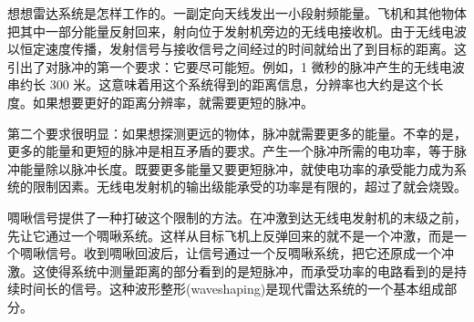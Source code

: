 想想雷达系统是怎样工作的。一副定向天线发出一小段射频能量。飞机和其他物体把其中一部分能量反射回来，射向位于发射机旁边的无线电接收机。由于无线电波以恒定速度传播，发射信号与接收信号之间经过的时间就给出了到目标的距离。这引出了对脉冲的第一个要求：它要尽可能短。例如，1
微秒的脉冲产生的无线电波串约长 300
米。这意味着用这个系统得到的距离信息，分辨率也大约是这个长度。如果想要更好的距离分辨率，就需要更短的脉冲。

第二个要求很明显：如果想探测更远的物体，脉冲就需要更多的能量。不幸的是，更多的能量和更短的脉冲是相互矛盾的要求。产生一个脉冲所需的电功率，等于脉冲能量除以脉冲长度。既要更多能量又要更短脉冲，就使电功率的承受能力成为系统的限制因素。无线电发射机的输出级能承受的功率是有限的，超过了就会烧毁。

啁啾信号提供了一种打破这个限制的方法。在冲激到达无线电发射机的末级之前，先让它通过一个啁啾系统。这样从目标飞机上反弹回来的就不是一个冲激，而是一个啁啾信号。收到啁啾回波后，让信号通过一个反啁啾系统，把它还原成一个冲激。这使得系统中测量距离的部分看到的是短脉冲，而承受功率的电路看到的是持续时间长的信号。这种波形整形(waveshaping)是现代雷达系统的一个基本组成部分。
